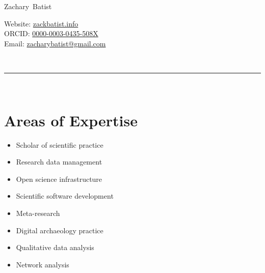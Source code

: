 \documentclass[11pt, a4paper]{article}
\makeatletter
\newcommand{\FirstName}{Zachary}
\newcommand{\LastName}{Batist}
\newcommand{\MyName}{\FirstName\ \LastName}
\newcommand{\Email}{zacharybatist@gmail.com}
\newcommand{\PersonalWebsite}{zackbatist.info}
\newcommand{\MyGitHub}{zackbatist}
\newcommand{\Twitter}{@mtl\_zack}
\newcommand{\Mastodon}{archaeo.social/@zackbatist}
\newcommand{\ORCID}{0000-0003-0435-508X}
\newcommand{\Duration}[2]{\fontsize{10pt}{0}\selectfont #1 -- #2}
\newcommand{\Ongoing}{present}
\newcommand{\Appointment}[4]{\textbf{#1} \newline #2 \newline #3 \newline #4}
\makeatother
\begin{document}
\thispagestyle{empty}

{\fontsize{22pt}{0}\selectfont\MyName}\\[-1.5cm]
\begin{minipage}[t]{1\textwidth}
  \begin{flushright}
    Website: \href{https://\PersonalWebsite}{\PersonalWebsite}\\
    ORCID: \href{https://orcid.org/\ORCID}{\ORCID}\\
    Email: \href{mailto:\Email}{\Email}
  \end{flushright}
\end{minipage}\\[0.1cm]
\rule{\textwidth}{0.2pt}\\[-1cm]



\section{Areas of Expertise}
\begin{multicols}{2}
  \begin{itemize}
      \item Scholar of scientific practice
      \item Research data management
      \item Open science infrastructure
      \item Scientific software development
      \item Meta-research
      \item Digital archaeology practice
      \item Qualitative data analysis
      \item Network analysis
  \end{itemize}
\end{multicols}
\end{document}

